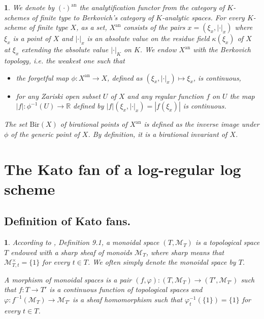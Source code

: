 \documentclass{amsart}%
\numberwithin{equation}{subsection}
\theoremstyle{plain2}
\theoremstyle{definition2}
\theoremstyle{stepstyle}
\theoremstyle{point}
\theoremstyle{subpoint}
\newtheorem{subpoint}[equation]{}%
\newcommand{\spa}[1]{\begin{subpoint}#1\end{subpoint}}           %
\newcommand{\R}{\ensuremath{\mathbb{R}}}
\newcommand{\cX}{\ensuremath{\mathscr{X}}}
\newcommand{\caM}{\ensuremath{\mathcal{M}}}
\renewcommand{\R}{\ensuremath{\mathbb{R}}}
\newcommand{\an}{\mathrm{an}}
\begin{document}

\spa{We denote by $(\cdot)^{\an}$ the analytification functor from the category of $K$-schemes of finite type to Berkovich's category of $K$-analytic spaces. For every $K$-scheme of finite type $X$, as a set, $X^{\an}$ consists of the pairs $x=(\xi_x,|\cdot|_x)$ where $\xi_x$ is a point of $X$ and $|\cdot|_x$ is an absolute value on the residue field $\kappa(\xi_x)$ of $X$ at $\xi_x$ extending the absolute value $|\cdot|_K$ on $K$. We endow $X^{\an}$ with the Berkovich topology, i.e. the weakest one such that \begin{itemize}
\item[(i)] the forgetful map $\phi: X^{\an} \rightarrow X$, defined as $(\xi_x,|\cdot|_x) \mapsto \xi_x$, is continuous,
\item[(ii)] for any Zariski open subset $U$ of $X$ and any regular function $f$ on $U$ the map $|f|:\phi^{-1}(U) \rightarrow \R$ defined by $|f|(\xi_x,|\cdot|_x)=|f(\xi_x)|$ is continuous.  
\end{itemize} The set $\text{Bir}(X)$ of birational points of $X^\an$ is defined as the inverse image under $\phi$ of the generic point of $X$. By definition, it is a birational invariant of $X$.}

\section{The Kato fan of a log-regular log scheme} \label{sect kato fan}

\subsection{Definition of Kato fans.}
\spa{ According to \cite{Kato1994a}, Definition 9.1, a monoidal space $(T, \caM_T)$ is a topological space $T$ endowed with a sharp sheaf of monoids $\caM_T$, where \textit{sharp} means that $\caM_{T,t}^\times = \{1\}$ for every $t \in T$. We often simply denote the monoidal space by $T$.

A morphism of monoidal spaces is a pair $(f,\varphi):(T,\caM_T) \rightarrow (T',\caM_{T'})$  such that $f:T \rightarrow T'$ is a continuous function of topological spaces and $\varphi: f^{-1}(\caM_T) \rightarrow \caM_{T'}$ is a sheaf homomorphism such that $\varphi_{t}^{-1}(\{1\})=\{1\}$ for every $t \in T$.}
\end{document}

